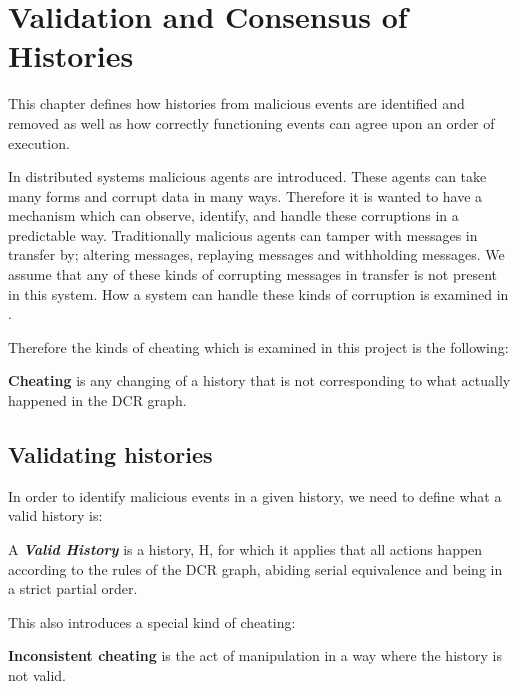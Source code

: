 \chapter{Validation and Consensus of Histories}
\label{chap:consensusindcr}
	This chapter defines how histories from malicious events are identified and removed as well as how correctly functioning events can agree upon an order of execution.
	
	\newpar In distributed systems malicious agents are introduced. These agents can take many forms and corrupt data in many ways. Therefore it is wanted to have a mechanism which can observe, identify, and handle these corruptions in a predictable way. Traditionally malicious agents can tamper with messages in transfer by; altering messages, replaying messages and withholding messages. We assume that any of these kinds of corrupting messages in transfer is not present in this system. How a system can handle these kinds of corruption is examined in .
	
	\newpar Therefore the kinds of cheating which is examined in this project is the following:
	\begin{definition}
		\textbf{Cheating} is any changing of a history that is not corresponding to what actually happened in the DCR graph.
	\end{definition}
	
	\section{Validating histories}
	In order to identify malicious events in a given history, we need to define what a valid history is:
	
		\begin{definition}
			A \textit{\textbf{Valid History}} is a history, H, for which it applies that all actions happen according to the rules of the DCR graph, abiding serial equivalence and being in a strict partial order. 
		\end{definition}
		
	This also introduces a special kind of cheating:
	
		\begin{definition}
			\textbf{Inconsistent cheating} is the act of manipulation  in a way where the history is not valid.
		\end{definition}
		
